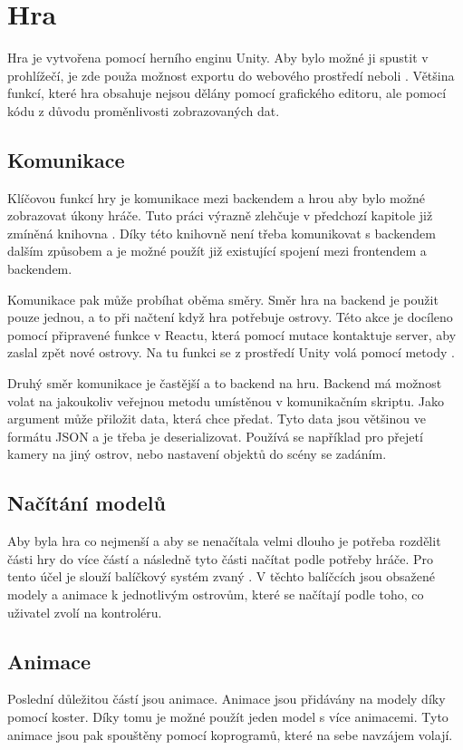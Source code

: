 \section{Hra}
Hra je vytvořena pomocí herního enginu Unity. Aby bylo možné ji spustit v prohlížečí, je zde použa možnost exportu do webového prostředí neboli . Většina funkcí, které hra obsahuje nejsou dělány pomocí grafického editoru, ale pomocí kódu z důvodu proměnlivosti zobrazovaných dat.

\subsection{Komunikace}
Klíčovou funkcí hry je komunikace mezi backendem a hrou aby bylo možné zobrazovat úkony hráče. Tuto práci výrazně zlehčuje v předchozí kapitole již zmíněná knihovna \cite{react-unity-webgl}. Díky této knihovně není třeba komunikovat s backendem dalším způsobem a je možné použít již existující spojení mezi frontendem a backendem.\par
Komunikace pak může probíhat oběma směry. Směr hra na backend je použit pouze jednou, a to při načtení když hra potřebuje ostrovy. Této akce je docíleno pomocí připravené funkce v Reactu, která pomocí mutace  kontaktuje server, aby zaslal zpět nové ostrovy. Na tu funkci se z prostředí Unity volá pomocí metody .\par
Druhý směr komunikace je častější a to backend na hru. Backend má možnost volat na jakoukoliv veřejnou metodu umístěnou v komunikačním skriptu. Jako argument může přiložit data, která chce předat. Tyto data jsou většinou ve formátu JSON a je třeba je deserializovat. Používá se například pro přejetí kamery na jiný ostrov, nebo nastavení objektů do scény se zadáním.

\subsection{Načítání modelů}
Aby byla hra co nejmenší a aby se nenačítala velmi dlouho je potřeba rozdělit části hry do více částí a následně tyto části načítat podle potřeby hráče. Pro tento účel je slouží balíčkový systém zvaný \cite{AssetBundle}. V těchto balíčcích jsou obsažené modely a animace k jednotlivým ostrovům, které se načítají podle toho, co uživatel zvolí na kontroléru.

\subsection{Animace}
Poslední důležitou částí jsou animace. Animace jsou přidávány na modely díky pomocí koster. Díky tomu je možné použít jeden model s více animacemi. Tyto animace jsou pak spouštěny pomocí koprogramů, které na sebe navzájem volají. 

